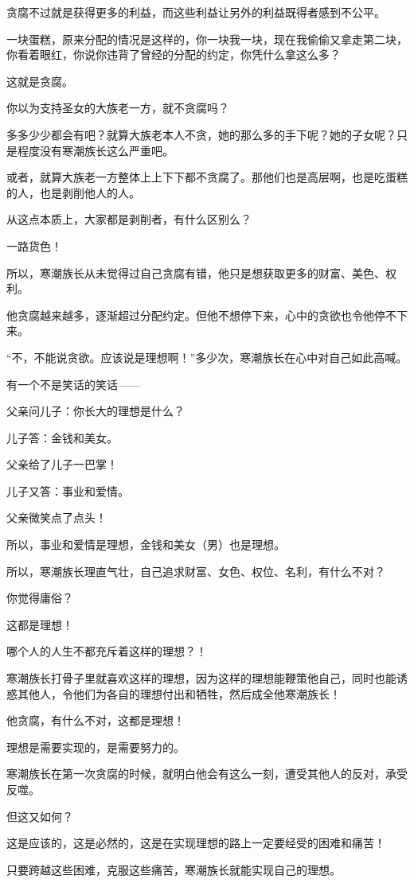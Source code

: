 \begin{this_body}
贪腐不过就是获得更多的利益，而这些利益让另外的利益既得者感到不公平。

一块蛋糕，原来分配的情况是这样的，你一块我一块，现在我偷偷又拿走第二块，你看着眼红，你说你违背了曾经的分配的约定，你凭什么拿这么多？

这就是贪腐。

你以为支持圣女的大族老一方，就不贪腐吗？

多多少少都会有吧？就算大族老本人不贪，她的那么多的手下呢？她的子女呢？只是程度没有寒潮族长这么严重吧。

或者，就算大族老一方整体上上下下都不贪腐了。那他们也是高层啊，也是吃蛋糕的人，也是剥削他人的人。

从这点本质上，大家都是剥削者，有什么区别么？

一路货色！

所以，寒潮族长从未觉得过自己贪腐有错，他只是想获取更多的财富、美色、权利。

他贪腐越来越多，逐渐超过分配约定。但他不想停下来，心中的贪欲也令他停不下来。

“不，不能说贪欲。应该说是理想啊！”多少次，寒潮族长在心中对自己如此高喊。

有一个不是笑话的笑话——

父亲问儿子：你长大的理想是什么？

儿子答：金钱和美女。

父亲给了儿子一巴掌！

儿子又答：事业和爱情。

父亲微笑点了点头！

所以，事业和爱情是理想，金钱和美女（男）也是理想。

所以，寒潮族长理直气壮，自己追求财富、女色、权位、名利，有什么不对？

你觉得庸俗？

这都是理想！

哪个人的人生不都充斥着这样的理想？！

寒潮族长打骨子里就喜欢这样的理想，因为这样的理想能鞭策他自己，同时也能诱惑其他人，令他们为各自的理想付出和牺牲，然后成全他寒潮族长！

他贪腐，有什么不对，这都是理想！

理想是需要实现的，是需要努力的。

寒潮族长在第一次贪腐的时候，就明白他会有这么一刻，遭受其他人的反对，承受反噬。

但这又如何？

这是应该的，这是必然的，这是在实现理想的路上一定要经受的困难和痛苦！

只要跨越这些困难，克服这些痛苦，寒潮族长就能实现自己的理想。


\end{this_body}
